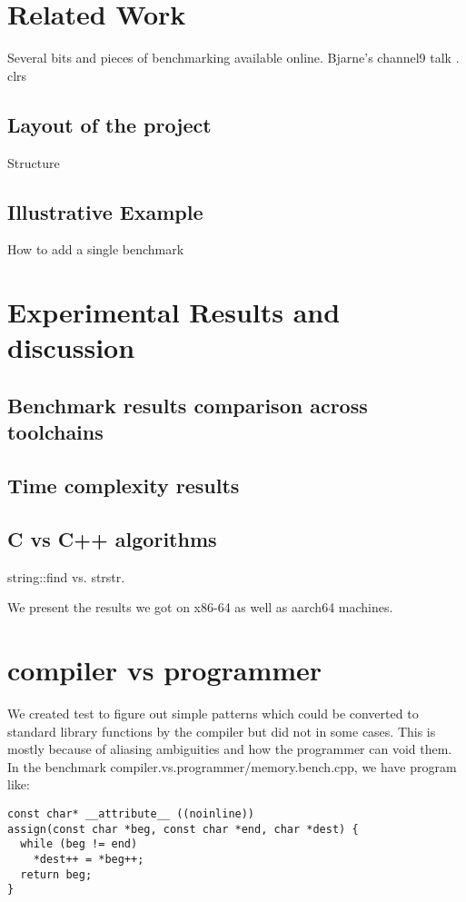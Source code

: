 \documentclass{sig-alternate}
\begin{document}
\section{Related Work}
Several bits and pieces of benchmarking available online.
Bjarne's channel9 talk \cite{stroustrup2012}.
clrs \cite{clrs}

\newpage

\subsection{Layout of the project}
Structure

\subsection{Illustrative Example} \label{subsec:example}
How to add a single benchmark \cite{googlebench}
\newpage

\section{Experimental Results and discussion}
\subsection{Benchmark results comparison across toolchains}

\subsection{Time complexity results}

\subsection{C vs C++ algorithms}
string::find vs. strstr.

We present the results we got on x86-64 as well as aarch64 machines.

\section{compiler vs programmer}
We created test to figure out simple patterns which could be converted to
standard library functions by the compiler but did not in some cases. This is mostly
because of aliasing ambiguities and how the programmer can void them.
In the benchmark compiler.vs.programmer/memory.bench.cpp, we have program like:

\begin{verbatim}
const char* __attribute__ ((noinline))
assign(const char *beg, const char *end, char *dest) {
  while (beg != end)
    *dest++ = *beg++;
  return beg;
}
\end{verbatim}
\end{document}
